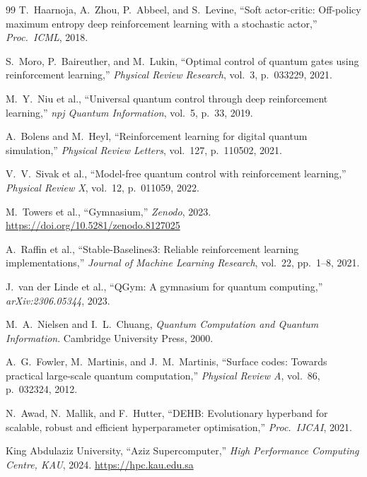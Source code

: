 \documentclass[journal]{IEEEtran}
\begin{document}
\begin{thebibliography}{99}
T.~Haarnoja, A.~Zhou, P.~Abbeel, and S.~Levine,
``Soft actor-critic: Off-policy maximum entropy deep reinforcement learning
with a stochastic actor,''
\textit{Proc.\ ICML}, 2018.

S.~Moro, P.~Baireuther, and M.~Lukin,
``Optimal control of quantum gates using reinforcement learning,''
\textit{Physical Review Research}, vol.~3, p.~033229, 2021.

M.~Y.~Niu et al.,
``Universal quantum control through deep reinforcement learning,''
\textit{npj Quantum Information}, vol.~5, p.~33, 2019.

A.~Bolens and M.~Heyl,
``Reinforcement learning for digital quantum simulation,''
\textit{Physical Review Letters}, vol.~127, p.~110502, 2021.

V.~V.~Sivak et al.,
``Model-free quantum control with reinforcement learning,''
\textit{Physical Review X}, vol.~12, p.~011059, 2022.

M.~Towers et al.,
``Gymnasium,''
\textit{Zenodo}, 2023. \url{https://doi.org/10.5281/zenodo.8127025}

A.~Raffin et al.,
``Stable-Baselines3: Reliable reinforcement learning implementations,''
\textit{Journal of Machine Learning Research}, vol.~22, pp.~1--8, 2021.

J.~van der Linde et al.,
``QGym: A gymnasium for quantum computing,''
\textit{arXiv:2306.05344}, 2023.

M.~A.~Nielsen and I.~L.~Chuang,
\textit{Quantum Computation and Quantum Information}.
Cambridge University Press, 2000.

A.~G.~Fowler, M.~Martinis, and J.~M.~Martinis,
``Surface codes: Towards practical large-scale quantum computation,''
\textit{Physical Review A}, vol.~86, p.~032324, 2012.

N.~Awad, N.~Mallik, and F.~Hutter,
``DEHB: Evolutionary hyperband for scalable, robust and efficient
hyperparameter optimisation,''
\textit{Proc.\ IJCAI}, 2021.

{King Abdulaziz University},
``Aziz Supercomputer,''
\textit{High Performance Computing Centre, KAU}, 2024.
\url{https://hpc.kau.edu.sa}



\end{thebibliography}
\end{document}
